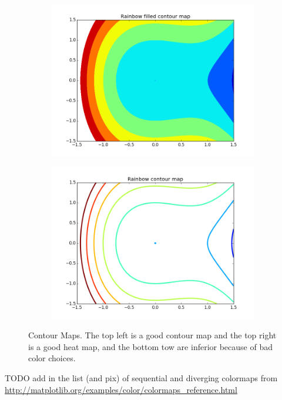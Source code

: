 \begin{figure}[h]
\begin{subfigure}{.45\textwidth}
\includegraphics[width=\textwidth]{contour_map_rainbow_filled.png}
\end{subfigure}
\begin{subfigure}{.45\textwidth}
\centering
\includegraphics[width=\textwidth]{contour_map_rainbow.png}
\end{subfigure}
\caption{Contour Maps.  The top left is a good contour map and the top right is a good heat map, and the bottom tow are inferior because of bad color choices.}
\label{fig:contour}
\end{figure}



TODO add in the list (and pix) of sequential and diverging colormaps from \url{http://matplotlib.org/examples/color/colormaps_reference.html} 




